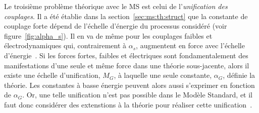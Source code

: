 Le troisième problème théorique avec le MS est celui de
l'\emph{unification des couplages}. Il a été établie dans la
section~\ref{sec:ms:th:struct} que la constante de couplage forte
dépend de l'échelle d'énergie du processus considéré (voir
figure~\ref{fig:alpha_s}). Il en va de même pour les couplages faibles
et électrodynamiques qui, contrairement à $\alpha_s$, augmentent en
force avec l'échelle d'énergie~\cite{thomson_modern_2013}. Si les
forces fortes, faibles et électriques sont fondamentalement des
manifestations d'une seule et même force dans une théorie
sous-jacente, alors il existe une échelle d'unification, $M_G$, à
laquelle une seule constante, $\alpha_G$, définie la théorie. Les
constantes à basse énergie peuvent alors aussi s'exprimer en fonction
de $\alpha_G$. Or, une telle unification n'est pas possible dans le
Modèle Standard, et il faut donc considérer des extenstions à la
théorie pour réaliser cette unification~\cite{olive_review_2014}.


